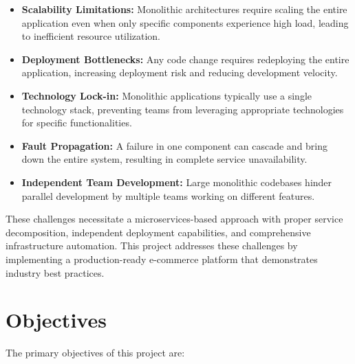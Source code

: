 \begin{itemize}
    \item \textbf{Scalability Limitations:} Monolithic architectures require scaling the entire application even when only specific components experience high load, leading to inefficient resource utilization.
    
    \item \textbf{Deployment Bottlenecks:} Any code change requires redeploying the entire application, increasing deployment risk and reducing development velocity.
    
    \item \textbf{Technology Lock-in:} Monolithic applications typically use a single technology stack, preventing teams from leveraging appropriate technologies for specific functionalities.
    
    \item \textbf{Fault Propagation:} A failure in one component can cascade and bring down the entire system, resulting in complete service unavailability.
    
    \item \textbf{Independent Team Development:} Large monolithic codebases hinder parallel development by multiple teams working on different features.
\end{itemize}

These challenges necessitate a microservices-based approach with proper service decomposition, independent deployment capabilities, and comprehensive infrastructure automation. This project addresses these challenges by implementing a production-ready e-commerce platform that demonstrates industry best practices.

\section{Objectives}

The primary objectives of this project are:

